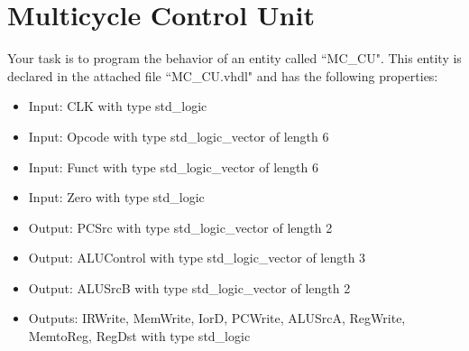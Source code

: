 \documentclass[a4paper,12pt]{article}
\begin{document}
\pagestyle{empty}
\setlength{\parindent}{0em}
\section*{\noindent Multicycle Control Unit }
Your task is to program the behavior of an entity called ``MC\_CU". This entity is declared in the attached file ``MC\_CU.vhdl" and has the following properties:

\begin{itemize}
	\item Input: CLK with type std\_logic
	\item Input: Opcode with type std\_logic\_vector of length 6
	\item Input: Funct with type std\_logic\_vector of length 6
	\item Input: Zero with type std\_logic

	\item Output: PCSrc with type std\_logic\_vector of length 2
	\item Output: ALUControl with type std\_logic\_vector of length 3
	\item Output: ALUSrcB with type std\_logic\_vector of length 2
	\item Outputs: IRWrite, MemWrite, IorD, PCWrite, ALUSrcA, RegWrite, MemtoReg, RegDst with type std\_logic

\end{itemize}
\end{document}
